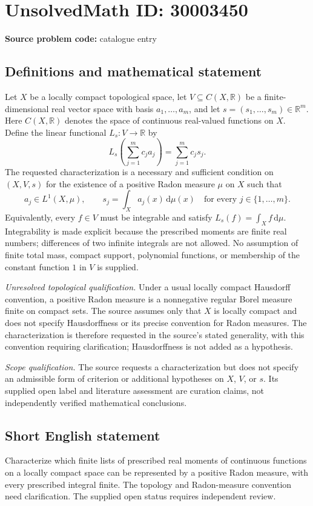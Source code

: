 \documentclass[11pt]{article}
\newcommand{\R}{\mathbb{R}}
\begin{document}
\section*{UnsolvedMath ID: 30003450}
\textbf{Source problem code:} catalogue entry
\subsection{Definitions and mathematical statement}
Let \(X\) be a locally compact topological space, let \(V\subseteq C(X,\R)\) be a finite-dimensional real vector space with basis \(a_1,\ldots,a_m\), and let \(s=(s_1,\ldots,s_m)\in\R^m\). Here \(C(X,\R)\) denotes the space of continuous real-valued functions on \(X\). Define the linear functional \(L_s:V\to\R\) by
\[
L_s\!\left(\sum_{j=1}^m c_j a_j\right)=\sum_{j=1}^m c_j s_j.
\]
The requested characterization is a necessary and sufficient condition on \((X,V,s)\) for the existence of a positive Radon measure \(\mu\) on \(X\) such that
\[
a_j\in L^1(X,\mu),\qquad
s_j=\int_X a_j(x)\,\mathrm d\mu(x)
\quad\text{for every }j\in\{1,\ldots,m\}.
\]
Equivalently, every \(f\in V\) must be integrable and satisfy \(L_s(f)=\int_X f\,\mathrm d\mu\). Integrability is made explicit because the prescribed moments are finite real numbers; differences of two infinite integrals are not allowed. No assumption of finite total mass, compact support, polynomial functions, or membership of the constant function \(1\) in \(V\) is supplied.

\emph{Unresolved topological qualification.} Under a usual locally compact Hausdorff convention, a positive Radon measure is a nonnegative regular Borel measure finite on compact sets. The source assumes only that \(X\) is locally compact and does not specify Hausdorffness or its precise convention for Radon measures. The characterization is therefore requested in the source's stated generality, with this convention requiring clarification; Hausdorffness is not added as a hypothesis.

\emph{Scope qualification.} The source requests a characterization but does not specify an admissible form of criterion or additional hypotheses on \(X\), \(V\), or \(s\). Its supplied open label and literature assessment are curation claims, not independently verified mathematical conclusions.
\subsection{Short English statement}
Characterize which finite lists of prescribed real moments of continuous functions on a locally compact space can be represented by a positive Radon measure, with every prescribed integral finite. The topology and Radon-measure convention need clarification. The supplied open status requires independent review.
\end{document}
